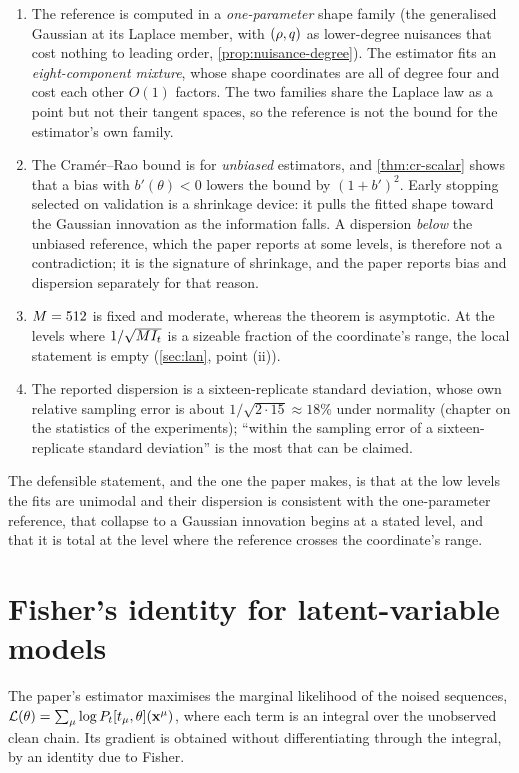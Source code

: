 \begin{enumerate}
\item The reference is computed in a \emph{one-parameter} shape family (the
  generalised Gaussian at its Laplace member, with $(\rho,q)$ as lower-degree
  nuisances that cost nothing to leading order, \cref{prop:nuisance-degree}). The
  estimator fits an \emph{eight-component mixture}, whose shape coordinates are all of
  degree four and cost each other $O(1)$ factors. The two families share the Laplace
  law as a point but not their tangent spaces, so the reference is not the bound for
  the estimator's own family.
\item The Cram\'er--Rao bound is for \emph{unbiased} estimators, and \cref{thm:cr-scalar}
  shows that a bias with $b'(\theta)<0$ lowers the bound by $(1+b')^2$. Early stopping
  selected on validation is a shrinkage device: it pulls the fitted shape toward the
  Gaussian innovation as the information falls. A dispersion \emph{below} the
  unbiased reference, which the paper reports at some levels, is therefore not a
  contradiction; it is the signature of shrinkage, and the paper reports bias and
  dispersion separately for that reason.
\item $M=512$ is fixed and moderate, whereas the theorem is asymptotic. At the
  levels where $1/\sqrt{M I_t}$ is a sizeable fraction of the coordinate's range,
  the local statement is empty (\cref{sec:lan}, point (ii)).
\item The reported dispersion is a sixteen-replicate standard deviation, whose own
  relative sampling error is about $1/\sqrt{2\cdot15}\approx18\%$ under normality
  (chapter on the statistics of the experiments); ``within the sampling error of a
  sixteen-replicate standard deviation'' is the most that can be claimed.
\end{enumerate}
The defensible statement, and the one the paper makes, is that at the low levels the
fits are unimodal and their dispersion is consistent with the one-parameter reference,
that collapse to a Gaussian innovation begins at a stated level, and that it is total
at the level where the reference crosses the coordinate's range.

\section{Fisher's identity for latent-variable models}
\label{sec:fisher-identity}

The paper's estimator maximises the marginal likelihood of the noised sequences,
$\mathcal{L}(\theta)=\sum_\mu\log P_t[t_\mu,\theta](\mathbf{x}^\mu)$, where each term is an integral
over the unobserved clean chain. Its gradient is obtained without differentiating
through the integral, by an identity due to Fisher.

